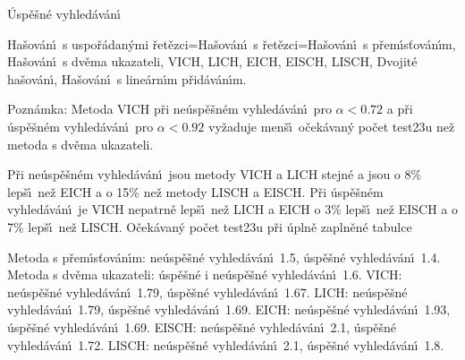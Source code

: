\documentclass[a4paper,12pt]{article}
\begin{document}
\subhead
\'Usp\v e\v sn\'e vyhled\'av\'an\'\i
\endsubhead

\flushpar\phantom{---}Ha\v sov\'an\'\i\ s uspo\v r\'adan\'ymi \v ret\v ezci=Ha\v sov\'an\'\i\ s 
\v ret\v ezci=Ha\v so\-v\'a\-n\'\i\ s p\v rem\'\i s\v tov\'an\'\i m,\newline 
\phantom{---}Ha\v sov\'an\'\i\ s dv\v ema ukazateli,\newline 
\phantom{---}VICH,\newline 
\phantom{---}LICH,\newline 
\phantom{---}EICH,\newline 
\phantom{---}EISCH,\newline 
\phantom{---}LISCH,\newline 
\phantom{---}Dvojit\'e ha\v sov\'an\'\i ,\newline 
\phantom{---}Ha\v sov\'an\'\i\ s line\'arn\'\i m p\v rid\'av\'an\'\i m.
\medskip

\flushpar Pozn\'amka: Metoda VICH p\v ri ne\'usp\v e\v sn\'em vyhled\'av\'an\'\i\ pro 
$\alpha <0.72$ a p\v ri \'usp\v e\v sn\'em vy\-hled\'av\'an\'\i\ pro $
\alpha <0.92$ 
vy\v zaduje men\v s\'\i\ o\v cek\'avan\'y po\v cet test\accent23u ne\v z 
metoda s dv\v ema ukazateli.

\flushpar P\v ri ne\'usp\v e\v sn\'em vyhled\'av\'an\'\i\ jsou metody VICH a LICH stejn\'e a jsou o 8\% lep\v s\'\i\ ne\v z 
EICH a o 15\% ne\v z metody LISCH a EISCH. P\v ri \'usp\v e\v sn\'em vyhled\'av\'an\'\i\ 
je VICH nepatrn\v e lep\v s\'\i\ ne\v z LICH a EICH o 3\% lep\v s\'\i\ ne\v z 
EISCH a o 7\% lep\v s\'\i\ ne\v z LISCH.
\medskip
\subhead
O\v cek\'avan\'y po\v cet test\accent23u p\v ri \'upln\v e zapln\v en\'e 
tabulce
\endsubhead

\flushpar\phantom{---}Metoda s p\v rem\'\i s\v tov\'an\'\i m: ne\'usp\v e\v sn\'e vyhled\'av\'an\'\i\ 1.5, \'usp\v e\v sn\'e 
vyhled\'av\'an\'\i\ 1.4.\newline 
\phantom{---}Metoda s dv\v ema ukazateli: \'usp\v e\v sn\'e i ne\'usp\v e\v sn\'e vyhled\'av\'an\'\i\  1.6.\newline 
\phantom{---}VICH: ne\'usp\v e\v sn\'e vyhled\'av\'an\'\i\ 1.79, \'usp\v e\v sn\'e vyhled\'av\'an\'\i\ 
1.67.\newline 
\phantom{---}LICH: ne\'usp\v e\v sn\'e vyhled\'av\'an\'\i\ 1.79, \'usp\v e\v sn\'e vyhled\'av\'an\'\i\ 
1.69.\newline 
\phantom{---}EICH: ne\'usp\v e\v sn\'e vyhled\'av\'an\'\i\ 1.93, \'usp\v e\v sn\'e vyhled\'av\'an\'\i\ 
1.69.\newline 
\phantom{---}EISCH: ne\'usp\v e\v sn\'e vyhled\'av\'an\'\i\ 2.1, \'usp\v e\v sn\'e vyhled\'av\'an\'\i\ 
1.72.\newline 
\phantom{---}LISCH: ne\'usp\v e\v sn\'e vyhled\'av\'an\'\i\ 2.1, \'usp\v e\v sn\'e vyhled\'av\'an\'\i\ 
1.8.
\medskip
\end{document}
